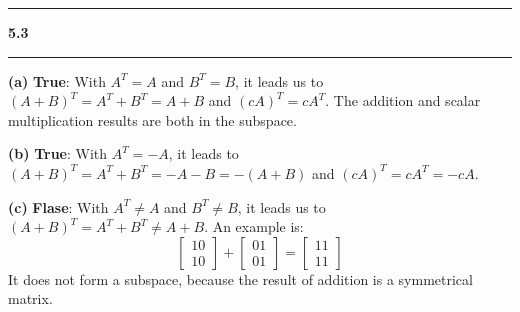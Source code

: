 \documentclass[11pt]{article}
\newcommand\question[2]{\vspace{.25in}\hrule\textbf{#1 #2}\vspace{.5em}\hrule\vspace{.10in}}
\renewcommand\part[1]{\vspace{.10in}\textbf{(#1)}}
\begin{document}
\question{5.3}{}
\part{a} \textbf{True}: With \(A^T = A\) and \(B^T = B\), it leads us to \((A + B)^{T} = A^T + B^T = A + B\) and \((cA)^T = cA^T\). The addition and scalar multiplication results are both in the subspace. 

\part{b} \textbf{True}: With \(A^T = -A\), it leads to \((A + B)^T = A^T + B^T= -A - B = - (A + B) \) and \((cA)^T = cA^T = -cA\).

\part{c} \textbf{Flase}: With \(A^T \neq A\) and \(B^T \neq B\), it leads us to \((A + B)^{T} = A^T + B^T \neq A + B\). An example is:
$$\begin{bmatrix} 1 0 \\ 1 0 \end{bmatrix} + \begin{bmatrix} 0 1 \\ 0 1 \end{bmatrix} = \begin{bmatrix} 1 1 \\ 1 1 \end{bmatrix}$$
It does not form a subspace, because the result of addition is a symmetrical matrix.
\end{document}
